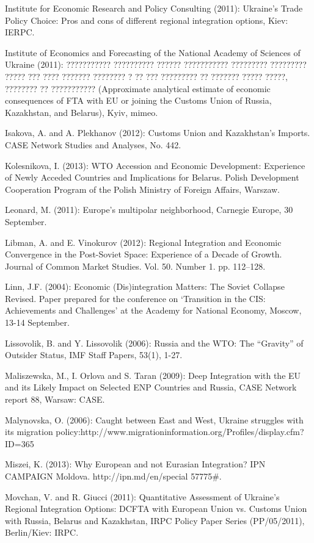Institute for Economic Research and Policy Consulting (2011): Ukraine's Trade Policy Choice: Pros and cons of different regional integration options, Kiev: IERPC.

Institute of Economics and Forecasting of the National Academy of Sciences of Ukraine (2011): ??????????? ?????????? ?????? ??????????? ????????? ????????? ????? ??? ???? ??????? ???????? ? ?? ??? ????????? ?? ??????? ????? ?????, ???????? ?? ??????????? (Approximate analytical estimate of economic consequences of FTA with EU or joining the Customs Union of Russia, Kazakhstan, and Belarus), Kyiv, mimeo.

Isakova, A. and A. Plekhanov (2012): Customs Union and Kazakhstan's Imports. CASE Network Studies and Analyses, No. 442.

Kolesnikova, I. (2013): WTO Accession and Economic Development: Experience of Newly Acceded Countries and Implications for Belarus. Polish Development Cooperation Program of the Polish Ministry of Foreign Affairs, Warszaw. 

Leonard, M. (2011): Europe's multipolar neighborhood, Carnegie Europe, 30 September.

Libman, A. and E. Vinokurov (2012): Regional Integration and Economic Convergence in the Post-Soviet Space: Experience of a Decade of Growth. Journal of Common Market Studies. Vol. 50. Number 1. pp. 112--128.

Linn, J.F. (2004): Economic (Dis)integration Matters: The Soviet Collapse Revised. Paper prepared for the conference on `Transition in the CIS: Achievements and Challenges' at the Academy for National Economy, Moscow, 13-14 September.

Lissovolik, B. and Y. Lissovolik (2006): Russia and the WTO: The ``Gravity'' of Outsider Status, IMF Staff Papers, 53(1), 1-27.

Maliszewska, M., I. Orlova and S. Taran (2009): Deep Integration with the EU and its Likely Impact on Selected ENP Countries and Russia, CASE Network report 88, Warsaw: CASE.

Malynovska, O. (2006): Caught between East and West, Ukraine struggles with its migration policy:http://www.migrationinformation.org/Profiles/display.cfm?ID=365

Miszei, K. (2013): Why European and not Eurasian Integration? IPN CAMPAIGN Moldova. http://ipn.md/en/special 57775\#.

Movchan, V. and R. Giucci (2011): Quantitative Assessment of Ukraine's Regional Integration Options: DCFTA with European Union vs. Customs Union with Russia, Belarus and Kazakhstan, IRPC Policy Paper Series (PP/05/2011), Berlin/Kiev: IRPC.

